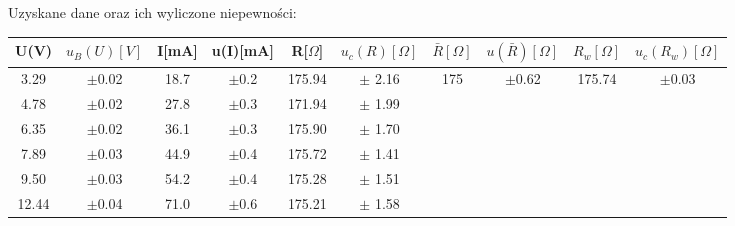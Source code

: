 \documentclass{article}
\begin{document}
\begin{table}[h]
    Uzyskane dane oraz ich wyliczone niepewności:\\
    \renewcommand{\arraystretch}{1.3}
\begin{tabular}{ |c|c|c|c|c|c|c|c|c|c| }
    \hline
    U(V)&$u_B (U)[V]$&I[mA]&u(I)[mA]&R[$\Omega$]&$u_c(R)[\Omega]$&$\bar{R}[\Omega]$&$u(\bar{R})[\Omega]$&$R_w[\Omega]$&$u_c(R_w)[\Omega]$ \\
    \hline \hline
    3.29&$\pm$0.02&18.7&$\pm$0.2&175.94&$\pm$ 2.16& \multirow{6}{*}{175}&\multirow{6}{*}{$\pm$0.62}&\multirow{6}{*}{175.74}&\multirow{6}{*}{$\pm$0.03}\\ 
    \cline{1-6}

    4.78&$\pm$0.02&27.8&$\pm$0.3&171.94&$\pm$ 1.99&&&&\\ 
    \cline{1-6}
  
    6.35&$\pm$0.02&36.1&$\pm$0.3&175.90&$\pm$ 1.70&&&&\\ 
    \cline{1-6}

    7.89&$\pm$0.03&44.9&$\pm$0.4&175.72&$\pm$ 1.41&&&&\\ 
    \cline{1-6}

    9.50&$\pm$0.03&54.2&$\pm$0.4&175.28&$\pm$ 1.51&&&&\\ 
    \cline{1-6}
    
    12.44&$\pm$0.04&71.0&$\pm$0.6&175.21&$\pm$ 1.58&&&&\\ 
    \hline
\end{tabular}
\label{tabular: t}
\end{table}
\newpage
\end{document}
